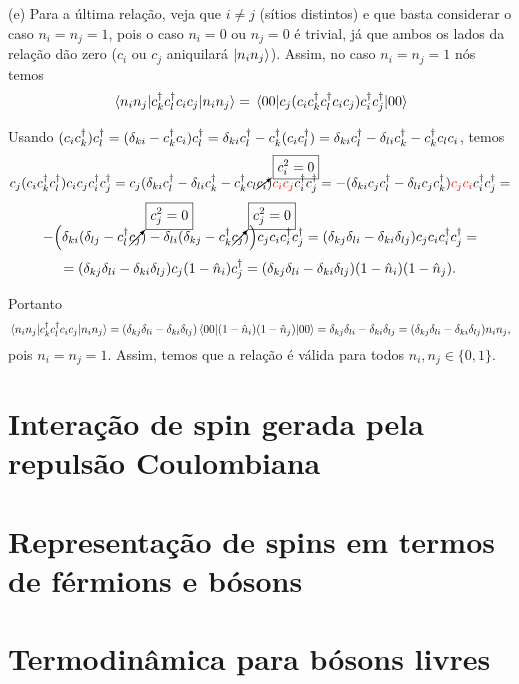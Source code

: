\documentclass[a4paper,10pt]{article}
\begin{document}
(e) Para a última relação, veja que $i \neq j$ (sítios distintos) e que basta considerar o caso $n_i = n_j = 1$, pois o caso $n_i = 0$ ou $n_j = 0$ é trivial, já que ambos os lados da relação dão zero ($c_i$ ou $c_j$ aniquilará $\ket{n_i n_j}$). Assim, no caso $n_i = n_j = 1$ nós temos
$$
\ev{c_k^\d c_l^\d c_i c_j}{n_i n_j} = \ev{c_j (c_i c_k^\d c_l^\d c_i c_j) c_i^\d c_j^\d}{00}
$$

Usando $(c_i c_k^\dagger) c_l^\dagger = (\delta_{ki} - c_k^\dagger c_i) c_l^\dagger = \delta_{ki} c_l^\dagger - c_k^\dagger (c_i c_l^\dagger) = \delta_{ki} c_l^\dagger - \delta_{li} c_k^\dagger - c_k^\dagger c_l c_i$, temos
$$
c_j (c_i c_k^\dagger c_l^\dagger) c_i c_j c_i^\dagger c_j^\dagger =
c_j (\delta_{ki} c_l^\dagger - \delta_{li} c_k^\dagger - c_k^\dagger c_l \cancelto{\boxed{c_i^2 = 0}}{c_i}) \textcolor{red}{c_i c_j} c_i^\dagger c_j^\dagger =
\textcolor{red}{-} (\delta_{ki} c_j c_l^\dagger - \delta_{li} c_j c_k^\dagger ) \textcolor{red}{c_j c_i} c_i^\dagger c_j^\dagger =
$$
$$
- \Big(\delta_{ki} (\delta_{lj} - c_l^\dagger \cancelto{\boxed{c_j^2 = 0}}{c_j}) - \delta_{li} (\delta_{kj} - c_k^\dagger \cancelto{\boxed{c_j^2 = 0}}{c_j}) \Big)
c_j c_i c_i^\dagger c_j^\dagger =
(\delta_{kj} \delta_{li} - \delta_{ki} \delta_{lj} ) c_j c_i c_i^\dagger c_j^\dagger =
$$
$$
= (\delta_{kj} \delta_{li} - \delta_{ki} \delta_{lj} ) c_j (1 - \hat{n}_i) c_j^\dagger =
(\delta_{kj} \delta_{li} - \delta_{ki} \delta_{lj} ) (1 - \hat{n}_i) (1 - \hat{n}_j).
$$

Portanto
$$
\ev{c_k^\d c_l^\d c_i c_j}{n_i n_j} = (\delta_{kj} \delta_{li} - \delta_{ki} \delta_{lj} ) \ev{(1 - \nn_i) (1 - \nn_j)}{00}
= \delta_{kj} \delta_{li} - \delta_{ki} \delta_{lj} = (\delta_{kj} \delta_{li} - \delta_{ki} \delta_{lj}) n_i n_j,
$$
pois $n_i = n_j = 1$. Assim, temos que a relação é válida para todos $n_i, n_j \in \{0, 1\}$.




\pagebreak



\section{Interação de spin gerada pela repulsão Coulombiana}



\pagebreak



\section{Representação de spins em termos de férmions e bósons}



\pagebreak



\section{Termodinâmica para bósons livres}
\end{document}
